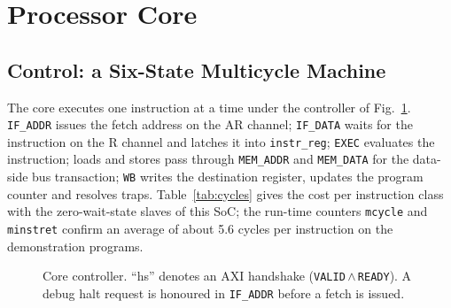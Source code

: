 \documentclass[journal,10pt]{IEEEtran}
\newcommand{\reg}[1]{\texttt{#1}}
\begin{document}
\section{Processor Core}\label{sec:core}
\subsection{Control: a Six-State Multicycle Machine}
The core executes one instruction at a time under the controller of
Fig.~\ref{fig:fsm}. \reg{IF\_ADDR} issues the fetch address on the AR
channel; \reg{IF\_DATA} waits for the instruction on the R channel and
latches it into \reg{instr\_reg}; \reg{EXEC} evaluates the instruction;
loads and stores pass through \reg{MEM\_ADDR} and \reg{MEM\_DATA} for the
data-side bus transaction; \reg{WB} writes the destination register, updates
the program counter and resolves traps. Table~\ref{tab:cycles} gives the
cost per instruction class with the zero-wait-state slaves of this SoC; the
run-time counters \reg{mcycle} and \reg{minstret} confirm an average of
about 5.6 cycles per instruction on the demonstration programs.

\begin{figure}[t]
\centering
{}
\caption{Core controller. ``hs'' denotes an AXI handshake (\reg{VALID}\,$\wedge$\,\reg{READY}). A debug halt request is honoured in \reg{IF\_ADDR} before a fetch is issued.}
\label{fig:fsm}
\end{figure}
\end{document}

